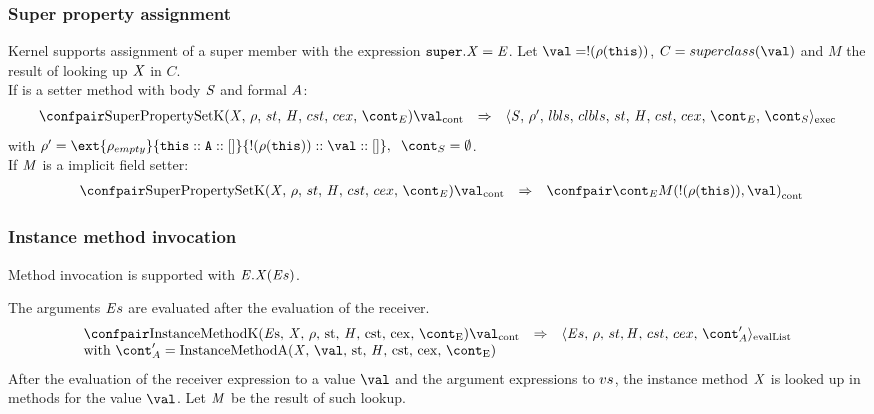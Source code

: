 \documentclass{article}
\begin{document}
\subsubsection{Super property assignment}
\label{subsubsec:super-property-assignemnt}
Kernel supports assignment of a super member with the expression $\tt{super}.\mathit{X}=\mathit{E}$. 
Let $\val = \deref{(\env(\this))}$, $C = \superclass{\val}$ and $M$ the result of looking up $\mathit{X}$ in $C$.\\
If is a setter method with body $\mathit{S}$ and formal $A$:
\[
  \begin{array}{lcl}
	\cesktrans{
		\contconf{\SuperPropertySetK}{\val}}{
		\execconf{\stmt}{\env'}{\lbls}{\clbls}{\handler}{\cstrace}{\cex}{\econt}{\scont}}\\
  \end{array}
\]
with $\env' =  \ext{\env_{empty}}{\this :: \formal :: []}{\deref{(\env(\this))} :: \val :: []}, \hspace{2mm}\scont = \emptyset$.\\
If $\mathit{M}$ is a implicit field setter:
\[
  \begin{array}{lcl}
	\hspace{2mm}
	\cesktrans{
		\contconf{\SuperPropertySetK}{\val}}{
		\contconf{\econt}{M(\deref{(\env(\this))}, \val)}}
  \end{array}
\]
\subsubsection{Instance method invocation}
\label{subsubsec:instance-method-invoc}
Method invocation is supported with $\mathit{E}.\mathit{X}(\mathit{E}{s})$.

\noindent
The arguments $\mathit{E}{s}$ are evaluated after the evaluation of the receiver.
\newcommand{\InstanceMethodInvocationArgsApp}{\mathrm{InstanceMethodA(\idmeta,\,\val,\,\strace,\,\handler,\,\cstrace,\,\cex,\,\econt)}}
\[
  \begin{array}{lcl}
	\cesktrans{
		\contconf{\InstanceMethodK}{\val}}{
		\evallistconf{\expressionsmeta}{\env}{\strace}{\cstrace}{\cex}{\acont'}}
	\\
	\textrm{with } \acont' = \InstanceMethodInvocationArgsApp
  \end{array}
\]
\noindent
After the evaluation of the receiver expression to a value $\val$ and the argument expressions to $vs$, the instance method $\mathit{X}$ is looked up in methods for the value $\val$. Let $\mathit{M}$ be the result of such lookup.
\end{document}
